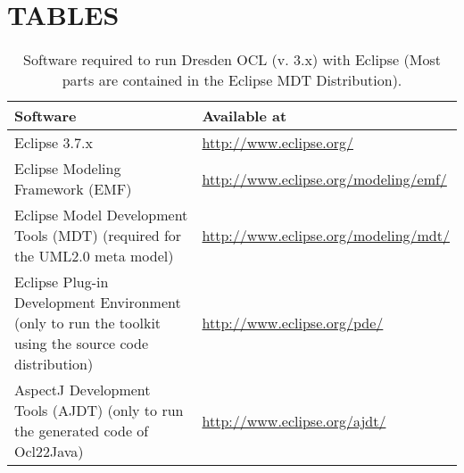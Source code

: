\cleardoublepage
{}
{}
\chapter*{TABLES}

\begin{table}[h]
\begin{tabular}{|p{7cm}|p{7cm}|}
    \hline
    \textbf{Software} & \textbf{Available at} \\
    \hline
    Eclipse 3.7.x & \url{http://www.eclipse.org/} \\
    \hline
    Eclipse Modeling Framework (EMF) & \url{http://www.eclipse.org/modeling/emf/} \\
    \hline
    Eclipse Model Development Tools (MDT) 
    \newline\footnotesize(required for the UML2.0 meta model) &
    \url{http://www.eclipse.org/modeling/mdt/} \\
    \hline
    Eclipse Plug-in Development Environment 
    \newline\footnotesize(only to run the toolkit using the source code
    distribution) & \url{http://www.eclipse.org/pde/} \\
    \hline
    AspectJ Development Tools (AJDT) 
    \newline\footnotesize(only to run the generated code of Ocl22Java) &
    \url{http://www.eclipse.org/ajdt/} \\
    \hline
\end{tabular}
\caption{Software required to run Dresden OCL (v. 3.x) with Eclipse \newline(Most parts are con\-tained in the Eclipse MDT Distribution).}
\label{tab:software}
\end{table}


